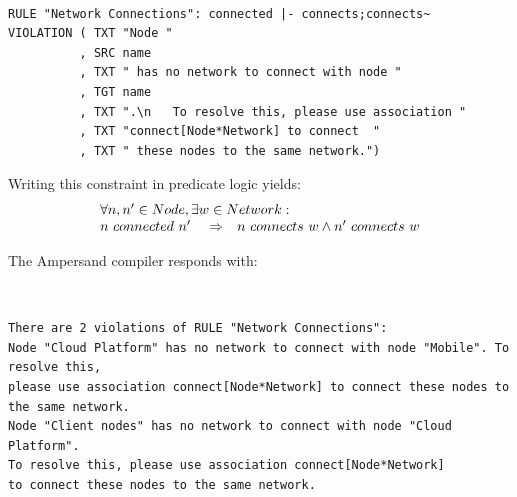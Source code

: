 \documentclass[sn-vancouver]{sn-jnl}%
\begin{document}
{\tt\small
\begin{lstlisting}[frame=single, label={mc5}, caption={}]
RULE "Network Connections": connected |- connects;connects~
VIOLATION ( TXT "Node "
          , SRC name
          , TXT " has no network to connect with node "
          , TGT name
          , TXT ".\n   To resolve this, please use association "
          , TXT "connect[Node*Network] to connect  "
          , TXT " these nodes to the same network.")
\end{lstlisting}
}

Writing this constraint in predicate logic yields:
\[\begin{array}{rcl}
   \multicolumn{3}{l}{\forall n,n' \in Node, \exists w\in Network:}\\
   n\ connected\ n'\ &\Rightarrow&n\ connects\ w\wedge n'\ connects\ w
\end{array}\]

The Ampersand compiler responds with:

{\tt\small
\begin{lstlisting}[frame=single, label={mc5result}, caption={}]
There are 2 violations of RULE "Network Connections":
Node "Cloud Platform" has no network to connect with node "Mobile". To resolve this,
please use association connect[Node*Network] to connect these nodes to the same network.
Node "Client nodes" has no network to connect with node "Cloud Platform".
To resolve this, please use association connect[Node*Network]
to connect these nodes to the same network.   
\end{lstlisting}
}
\end{document}
